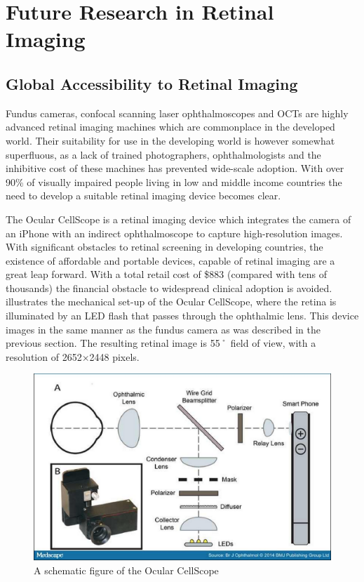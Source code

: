
\chapter{Future Research in Retinal Imaging}

\label{future_research}


\section {Global Accessibility to Retinal Imaging}

Fundus cameras, confocal scanning laser ophthalmoscopes and OCTs are
highly advanced retinal imaging machines which are commonplace in the
developed world. Their suitability for use in the developing world is
however somewhat superfluous, as a lack of trained photographers,
ophthalmologists and the inhibitive cost of these machines has prevented
wide-scale adoption. With over 90\% of visually impaired people living
in low and middle income countries the need to develop a suitable
retinal imaging device becomes clear.\cite{burgess2013diabetic} 

The Ocular CellScope is a retinal imaging device which integrates the
camera of an iPhone with an indirect ophthalmoscope to capture
high-resolution images. With significant obstacles to retinal screening
in developing countries, the existence of affordable and portable devices,
capable of retinal imaging are a great leap forward. With a total retail
cost of \$883 (compared with tens of thousands) the financial obstacle
to widespread clinical adoption is avoided.  illustrates
the mechanical set-up of the Ocular CellScope, where the retina is
illuminated by an LED flash that passes through the ophthalmic lens.
This device images in the same manner as the fundus camera as was described
in the previous section. The resulting retinal image is 55˚ field of view,
with a resolution of 2652×2448 pixels. \cite{medscape}

\begin{figure}[htbp]
\centering
 \includegraphics{figures/ocular}
\caption{A schematic figure of the Ocular CellScope \cite{medscape} }
\label{fig:ocular}
\end{figure}


